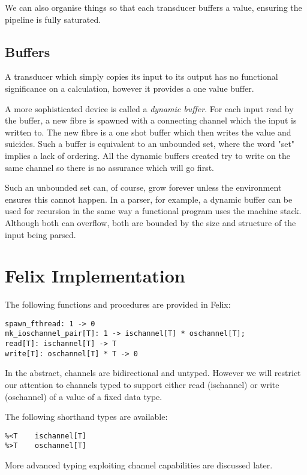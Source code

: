 \documentclass{article}
\begin{document}
We can also organise things so that each transducer buffers
a value, ensuring the pipeline is fully saturated.

\subsection{Buffers}
A transducer which simply copies its input to its output
has no functional significance on a calculation, however
it provides a one value buffer.

A more sophisticated device is called a {\em dynamic buffer}.
For each input read by the buffer, a new fibre is spawned
with a connecting channel which the input is written to.
The new fibre is a one shot buffer which then writes the
value and suicides. Such a buffer is equivalent to an unbounded
set, where the word "set" implies a lack of ordering.
All the dynamic buffers created try to write on the same channel
so there is no assurance which will go first. 

Such an unbounded set can, of course, grow forever unless
the environment ensures this cannot happen. In a parser,
for example, a dynamic buffer can be used for recursion
in the same way a functional program uses the machine stack.
Although both can overflow, both are bounded by the size
and structure of the input being parsed.

\section{Felix Implementation}
The following functions and procedures are provided in Felix:

\begin{verbatim}
spawn_fthread: 1 -> 0
mk_ioschannel_pair[T]: 1 -> ischannel[T] * oschannel[T];
read[T]: ischannel[T] -> T
write[T]: oschannel[T] * T -> 0
\end{verbatim}

In the abstract, channels are bidirectional and untyped.
However we will restrict our attention to channels
typed to support either read (ischannel) or write (oschannel)
of a value of a fixed data type.

The following shorthand types are available:

\begin{verbatim}
%<T    ischannel[T]
%>T    oschannel[T]
\end{verbatim}

More advanced typing exploiting channel capabilities are
discussed later.
\end{document}
